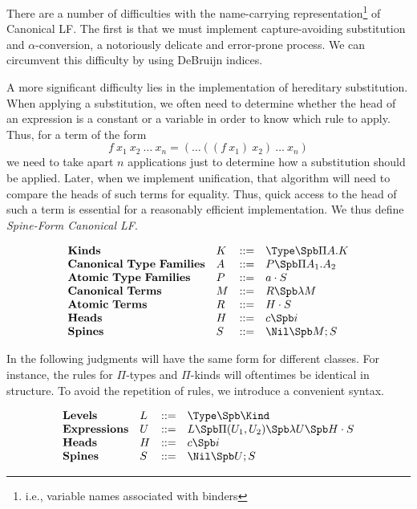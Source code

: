 \renewcommand{\PiTyp}[2]{\Pi #1.#2}
\renewcommand{\Lam}[1]{\lambda #1}

There are a number of difficulties with the name-carrying 
representation\footnote{i.e., variable names associated with binders}
of Canonical LF.  The first is that we must
implement capture-avoiding substitution and $\alpha$-conversion,
a notoriously delicate and error-prone process.
We can circumvent this difficulty
by using DeBruijn indices\cite{DeBruijn80}. 

 A more significant 
difficulty lies in the implementation of hereditary substitution. 
When applying a substitution, we often need to determine whether
the head of an expression is a constant or a variable in order
to know which rule to apply.  Thus, for a term of the form
$$f\ x_1\ x_2\ \ldots\ x_n = (\ldots((f\ x_1)\ x_2)\ \ldots\ x_n) $$
we need to take apart $n$ applications just to determine how
a substitution should be applied.  Later, when we implement
unification, that algorithm will need to compare the heads
of such terms for equality.  Thus, quick access to the head
of such a term is essential for a reasonably efficient implementation.
We thus define \emph{Spine-Form Canonical LF}.

$$
\begin{array}{llll}
\mathbf{Kinds} & K & ::= & \Type \Spb \PiTyp{A}{K} \\
\mathbf{Canonical\ Type\ Families} & A & ::= & P \Spb \PiTyp{A_1}{A_2} \\
\mathbf{Atomic\ Type\ Families} & P & ::= & a\cdot S \\
\mathbf{Canonical\ Terms} & M & ::= & R \Spb \Lam{M} \\
\mathbf{Atomic\ Terms} & R & ::= & H\cdot S \\
\mathbf{Heads} & H & ::= & c \Spb i\\
\mathbf{Spines} & S & ::= & \Nil \Spb M;S\\
\end{array} 
$$

In the following judgments will have the same
form for different classes.  For instance,
the rules for $\Pi$-types and $\Pi$-kinds will
oftentimes be identical in structure.  To avoid the
repetition of rules, we introduce a convenient 
syntax.

$$
\begin{array}{llll}
\mathbf{Levels} & L & ::= & \Type \Spb \Kind \\
\mathbf{Expressions} & U & ::= & L \Spb \Pi(U_1,U_2) \Spb \lambda U \Spb H\cdot S \\
\mathbf{Heads} & H & ::= & c \Spb i\\
\mathbf{Spines} & S & ::= & \Nil \Spb U;S\\
\end{array} 
$$


